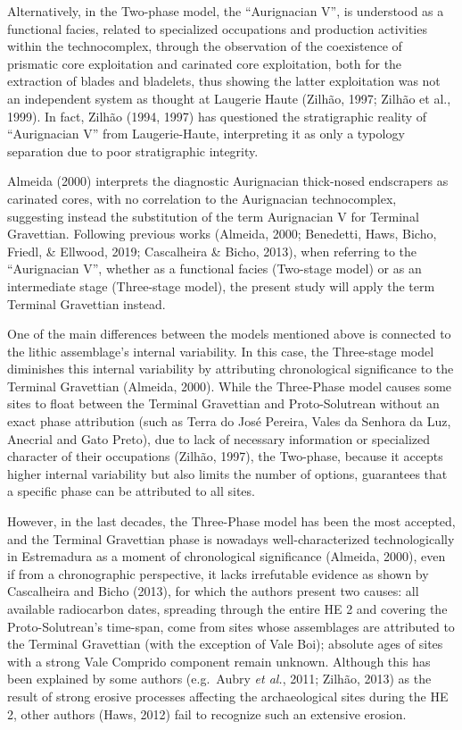 \documentclass[12pt,twoside]{reedthesis}
\begin{document}
Alternatively, in the Two-phase model, the ``Aurignacian V'', is understood as a functional facies, related to specialized occupations and production activities within the technocomplex, through the observation of the coexistence of prismatic core exploitation and carinated core exploitation, both for the extraction of blades and bladelets, thus showing the latter exploitation was not an independent system as thought at Laugerie Haute (Zilhão, 1997; Zilhão et al., 1999). In fact, Zilhão (1994, 1997) has questioned the stratigraphic reality of ``Aurignacian V'' from Laugerie-Haute, interpreting it as only a typology separation due to poor stratigraphic integrity.

Almeida (2000) interprets the diagnostic Aurignacian thick-nosed endscrapers as carinated cores, with no correlation to the Aurignacian technocomplex, suggesting instead the substitution of the term Aurignacian V for Terminal Gravettian. Following previous works (Almeida, 2000; Benedetti, Haws, Bicho, Friedl, \& Ellwood, 2019; Cascalheira \& Bicho, 2013), when referring to the ``Aurignacian V'', whether as a functional facies (Two-stage model) or as an intermediate stage (Three-stage model), the present study will apply the term Terminal Gravettian instead.

One of the main differences between the models mentioned above is connected to the lithic assemblage's internal variability. In this case, the Three-stage model diminishes this internal variability by attributing chronological significance to the Terminal Gravettian (Almeida, 2000). While the Three-Phase model causes some sites to float between the Terminal Gravettian and Proto-Solutrean without an exact phase attribution (such as Terra do José Pereira, Vales da Senhora da Luz, Anecrial and Gato Preto), due to lack of necessary information or specialized character of their occupations (Zilhão, 1997), the Two-phase, because it accepts higher internal variability but also limits the number of options, guarantees that a specific phase can be attributed to all sites.

However, in the last decades, the Three-Phase model has been the most accepted, and the Terminal Gravettian phase is nowadays well-characterized technologically in Estremadura as a moment of chronological significance (Almeida, 2000), even if from a chronographic perspective, it lacks irrefutable evidence as shown by Cascalheira and Bicho (2013), for which the authors present two causes: all available radiocarbon dates, spreading through the entire HE 2 and covering the Proto-Solutrean's time-span, come from sites whose assemblages are attributed to the Terminal Gravettian (with the exception of Vale Boi); absolute ages of sites with a strong Vale Comprido component remain unknown.
Although this has been explained by some authors (e.g.~Aubry \emph{et al.}, 2011; Zilhão, 2013) as the result of strong erosive processes affecting the archaeological sites during the HE 2, other authors (Haws, 2012) fail to recognize such an extensive erosion.
\end{document}
